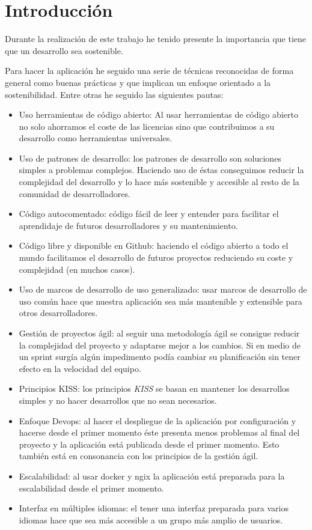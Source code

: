 
\section{Introducción}
Durante la realización de este trabajo he tenido presente la importancia 
que tiene que un desarrollo sea sostenible.

Para hacer la aplicación he seguido una serie de técnicas reconocidas de forma 
general como buenas prácticas y que implican un enfoque orientado a la sostenibilidad.
Entre otras he seguido las siguientes pautas:
\begin{itemize}
    \item Uso herramientas de código abierto: Al usar herramientas de código abierto no solo 
          ahorramos el coste de las licencias sino que contribuimos a su desarrollo como herramientas universales. 
    \item Uso de patrones de desarrollo: los patrones de desarrollo son soluciones simples 
          a problemas complejos. Haciendo uso de éstas conseguimos reducir 
          la complejidad del desarrollo y lo hace más sostenible y 
          accesible al resto de la comunidad de desarrolladores. 
    \item Código autocomentado: código fácil de leer y entender para facilitar el 
            aprendidaje de futuros desarrolladores y su mantenimiento.
    \item Código libre y disponible en Github: haciendo el código abierto a todo el mundo facilitamos 
            el desarrollo de futuros proyectos reduciendo su coste y complejidad (en muchos casos). 
    \item Uso de marcos de desarrollo de uso generalizado: usar marcos de desarrollo de uso común hace 
            que nuestra aplicación sea más mantenible y extensible para otros desarrolladores.
    \item Gestión de proyectos ágil: al seguir una metodología ágil se consigue reducir la complejidad del 
        proyecto y adaptarse mejor a los cambios. Si en medio de un sprint surgía algún impedimento 
        podía cambiar su planificación sin tener efecto en la velocidad del equipo. 
    \item Principios KISS: los principios \emph{KISS} se basan en mantener los desarrollos simples y 
        no hacer desarrollos que no sean necesarios.
    \item Enfoque Devops: al hacer el despliegue de la aplicación por configuración y hacerse desde el 
        primer momento éste presenta menos problemas al final del proyecto y la aplicación está publicada 
        desde el primer momento. Esto también está en consonancia con los principios de la gestión ágil. 
    \item Escalabilidad: al usar docker y ngix la aplicación está preparada para la escalabilidad desde el primer momento.
    \item Interfaz en múltiples idiomas: el tener una interfaz preparada para varios idiomas hace que sea más 
        accesible a un grupo más amplio de usuarios.
\end{itemize}

